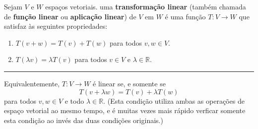 \begin{definition}
	Sejam $V$ e $W$ espaços vetoriais. uma \textbf{transformação linear} (também chamada de \textbf{função linear} ou \textbf{aplicação linear}) de $V$ em $W$ é uma função $T\colon V\to W$ que satisfaz às seguintes propriedades:
	\begin{enumerate}
		\item $T(v+w)=T(v)+T(w)$ para todos $v,w\in V$.
		\item $T(\lambda v)=\lambda T(v)$ para todos $v\in V$ e $\lambda\in\mathbb{R}$.
	\end{enumerate}
	
	\hrule

	Equivalentemente, $T\colon V\to W$ é linear se, e somente se
	\[T(v+\lambda w)=T(v)+\lambda T(w)\]
	para todos $v,w\in V$ e todo $\lambda\in\mathbb{R}$. (Esta condição utiliza ambas as operações de espaço vetorial ao mesmo tempo, e é muitas vezes mais rápido verficar somente esta condição ao invés das duas condições originais.) 
\end{definition}